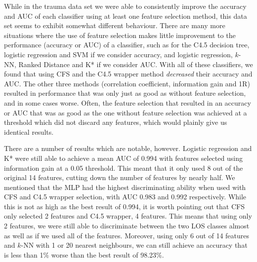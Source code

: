 While in the trauma data set we were able to consistently improve the accuracy
and AUC of each classifier using at least one feature selection method,
this data set seems to exhibit somewhat different
behaviour. There are many more situations where the use of feature selection
makes little improvement to the performance (accuracy or AUC) of a classifier,
such as for the C4.5 decision tree, logistic regression and SVM if we consider
accuracy, and logistic regression, $k$-NN, Ranked Distance and K* if we
consider AUC. With all of these classifiers, we found that using CFS and the
C4.5 wrapper method \textit{decreased} their accuracy and AUC. The other three
methods (correlation coefficient, information gain and 1R) resulted in
performance that was only just as good as without feature selection, and in
some cases worse. Often, the feature selection that resulted in an accuracy
or AUC that was as good as the one without feature selection was achieved at
a threshold which did not discard any features, which would plainly give us
identical results.

There are a number of results which are notable, however. Logistic regression
and K*
were still able to achieve a mean AUC of 0.994 with features selected using
information gain at a 0.05 threshold. This meant that it only used 8 out of
the original 14 features, cutting down the number of features by nearly half.
We mentioned that the MLP had the highest discriminating ability when used with
CFS and C4.5 wrapper selection, with AUC 0.983 and 0.992 respectively. While
this is not as high as the best result of 0.994, it is worth pointing out that
CFS only selected 2 features and C4.5 wrapper, 4 features. This means that
using only 2 features, we were still able to discriminate between the two LOS
classes almost as well as if we used all of the features. Moreover, using
only 6 out of 14 features and $k$-NN with 1 or 20 nearest neighbours, we can
still achieve an accuracy that is less than 1\% worse than the best result
of 98.23\%.

